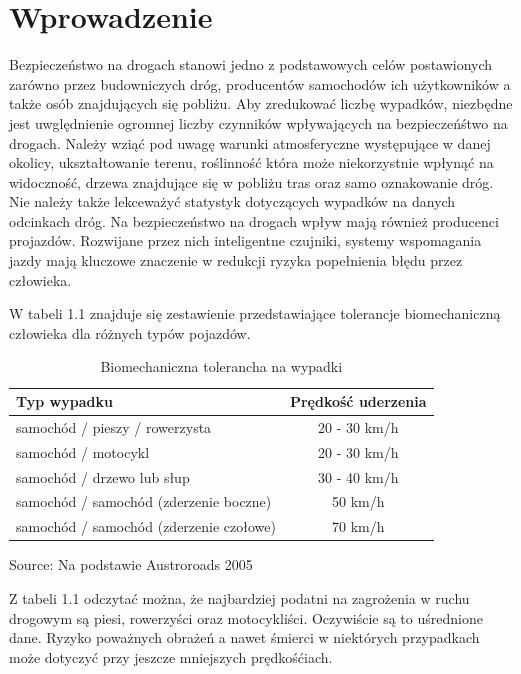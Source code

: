 \chapter{Wprowadzenie}
\label{cha:wprowadzenie}

Bezpieczeństwo na drogach stanowi jedno z podstawowych celów postawionych zarówno przez budowniczych dróg, producentów samochodów ich użytkowników a także osób znajdujących się pobliżu. Aby zredukować liczbę wypadków, niezbędne jest uwględnienie ogromnej liczby czynników wpływających na bezpieczeńśtwo na drogach. Należy wziąć pod uwagę warunki atmosferyczne występujące w danej okolicy, ukształtowanie terenu, roślinność która może niekorzystnie wpłynąć na widoczność, drzewa znajdujące się w pobliżu tras oraz samo oznakowanie dróg. Nie należy także lekceważyć statystyk dotyczących wypadków na danych odcinkach dróg. Na bezpieczeństwo na drogach wpływ mają również producenci projazdów. Rozwijane przez nich inteligentne czujniki, systemy wspomagania jazdy mają kluczowe znaczenie w redukcji ryzyka popełnienia błędu przez człowieka.

W tabeli 1.1 znajduje się zestawienie przedstawiające tolerancje biomechaniczną człowieka dla różnych typów pojazdów.

\newcommand{\source}[1]{\caption*{Source: {#1}} }

\begin{table}[ht]
\centering
\caption{Biomechaniczna tolerancha na wypadki}
\label{my-label}
\begin{tabular}{| l | c |}
\hline
\textbf{Typ wypadku}                    & \multicolumn{1}{l}{\textbf{Prędkość uderzenia}} \\ \hline
samochód / pieszy / rowerzysta          & 20 - 30 km/h                                    \\ \hline
samochód / motocykl                     & 20 - 30 km/h                                    \\ \hline
samochód / drzewo lub słup              & 30 - 40 km/h                                    \\ \hline
samochód / samochód (zderzenie boczne)  & 50 km/h                                         \\ \hline
samochód / samochód (zderzenie czołowe) & 70 km/h   \\ \hline
\end{tabular}
\source{Na podstawie Austroroads 2005}
\end{table}

Z tabeli 1.1 odczytać można, że najbardziej podatni na zagrożenia w ruchu drogowym są piesi, rowerzyści oraz motocykliści.  Oczywiście są to uśrednione dane. Ryzyko poważnych obrażeń a nawet śmierci w niektórych przypadkach może dotyczyć przy jeszcze mniejszych prędkośćiach.

